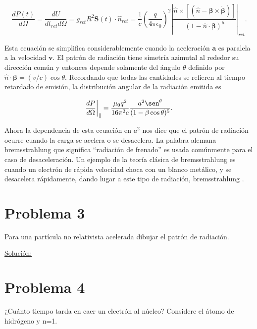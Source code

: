 \documentclass[a4paper,11pt]{article}
\numberwithin{equation}{section}
\newcommand{\zerodel}{.\kern-\nulldelimiterspace}
\begin{document}
\begin{equation}
 \frac{dP(t)}{d\Omega} = \frac{dU}{dt_{ret}d\Omega} = g_{ret} R^2 \mathbf{S}(t) 
 \cdot \hat{n}_{ret} = \frac{1}{c}\left(\frac{q}{4\pi\epsilon_0}\right)^2 
 \left|\frac{\hat{n} \times [(\hat{n} - 
 \pmb{\beta} \times \dot{\pmb{\beta}})]}{(1 - \hat{n}\cdot \pmb{\beta})^5}\right|_{ret}.
\end{equation}

Esta ecuación se simplifica considerablemente cuando la aceleración $\mathbf{a}$ es 
paralela a la velocidad $\mathbf{v}$. El patrón de radiación tiene simetría 
azimutal al rededor su dirección común y entonces depende solamente del 
ángulo $\theta$ definido por $\hat{n} \cdot \pmb{\beta} = (v/c)\cos{\theta}$. 
Recordando que todas las cantidades se refieren al tiempo retardado de 
emisión, la distribución angular de la radiación emitida es 

\begin{equation}
 \left\zerodel \frac{dP}{d\Omega}\right|_{\parallel} = \frac{\mu_0q^2}{16\pi^2c} 
 \frac{a^2\sen^{\theta}}{(1 - \beta\cos{\theta})^5}.
\end{equation}

Ahora la dependencia de esta ecuación en $a^2$ nos dice que el patrón de radiación 
ocurre cuando la carga se acelera o se desacelera. La palabra alemana bremsstrahlung 
que significa ``radiación de frenado'' es usada comúnmente para el caso de desaceleración. 
Un ejemplo de la teoría clásica de bremsstrahlung es cuando un electrón de rápida 
velocidad choca con un blanco metálico, y se desacelera rápidamente, dando lugar a 
este tipo de radiación, bremsstrahlung \cite{griffiths}.

\section{Problema 3}

Para una partícula no relativista acelerada dibujar el patrón de radiación.

\vspace{.3cm} \underline{Solución:} \vspace{.3cm}

\section{Problema 4}

¿Cuánto tiempo tarda en caer un electrón al núcleo? Considere el átomo de hidrógeno 
y n=1.
\end{document}
